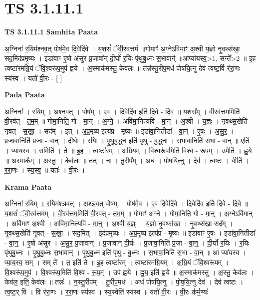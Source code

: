 \documentclass[17pt]{extarticle}
\begin{document}
\section{ TS 3.1.11.1 }

\textbf{TS 3.1.11.1 } \newline
\textbf{Samhita Paata} \newline

अ॒ग्निना॑ र॒यिम॑श्नव॒त् पोष॑मे॒व दि॒वेदि॑वे । य॒शसं॑ ॅवी॒रव॑त्तमं ॥गोमाꣳ॑ अ॒ग्नेऽवि॑माꣳ अ॒श्वी य॒ज्ञो नृ॒वथ्स॑खा॒ सद॒मिद॑प्रमृ॒ष्यः । इडा॑वाꣳ ए॒षो अ॑सुर प्र॒जावा᳚न् दी॒र्घो र॒यिः पृ॑थुबु॒ध्नः स॒भावान्॑ ॥आप्या॑यस्व॒>1, सन्ते᳚>2 ॥ इ॒ह त्वष्टा॑रमग्रि॒यं ॅवि॒श्वरू॑प॒मुप॑ ह्वये । अ॒स्माक॑मस्तु॒ केव॑लः ॥ तन्न॑स्तु॒रीप॒मध॑ पोषयि॒त्नु देव॑ त्वष्ट॒र्वि र॑रा॒णः स्य॑स्व । यतो॑ वी॒रः - [  ] \newline

\textbf{Pada Paata} \newline

अ॒ग्निना᳚ । र॒यिम् । अ॒श्न॒व॒त् । पोष᳚म् । ए॒व । दि॒वेदि॑व॒ इति॑ दि॒वे - दि॒व॒ ॥ य॒शस᳚म् । वी॒रव॑त्तम॒मिति॑ वी॒रव॑त् - त॒म॒म् ॥ गोमा॒निति॒ गो - मा॒न् । अ॒ग्ने॒ । अवि॑मा॒नित्यवि॑ - मा॒न् । अ॒श्वी । य॒ज्ञ्ः । नृ॒वथ्स॒खेति॑ नृ॒वत् - स॒खा॒ । सद᳚म् । इत् । अ॒प्र॒मृ॒ष्य इत्य॑प्र - मृ॒ष्यः ॥ इडा॑वा॒नितीडा᳚ - वा॒न् । ए॒षः । अ॒सु॒र॒ । प्र॒जावा॒निति॑ प्र॒जा - वा॒न् । दी॒र्घः । र॒यिः । पृ॒थु॒बु॒द्ध्न इति॑ पृथु - बु॒द्ध्नः । स॒भावा॒निति॑ स॒भा - वा॒न् ॥ एति॑ । प्या॒य॒स्व॒ । समिति॑ । ते॒ ॥ इ॒ह । त्वष्टा॑रम् । अ॒ग्रि॒यम् । वि॒श्वरू॑प॒मिति॑ वि॒श्व - रू॒प॒म् । उपेति॑ । ह्व॒ये॒ ॥ अ॒स्माक᳚म् । अ॒स्तु॒ । केव॑लः ॥ तत् । नः॒ । तु॒रीप᳚म् । अध॑ । पो॒ष॒यि॒त्नु । देव॑ । त्व॒ष्टः॒ । वीति॑ । र॒रा॒णः । स्य॒स्व॒ ॥ यतः॑ । वी॒रः ।  \newline


\textbf{Krama Paata} \newline

अ॒ग्निना॑ र॒यिम् । र॒यिम॑श्ञवत् । अ॒श्ञ॒व॒त् पोष᳚म् । पोष॑मे॒व । ए॒व दि॒वेदि॑वे । दि॒वेदि॑व॒ इति॑ दि॒वे - दि॒वे॒ ॥ य॒शसं॑ ॅवी॒रव॑त्तमम् । वी॒रव॑त्तम॒मिति॑ वी॒रव॑त् - त॒म॒म् ॥ गोमाꣳ॑ अग्ने । गोमा॒निति॒ गो - मा॒न्॒ । अ॒ग्नेऽवि॑मान् । अवि॑माꣳ अ॒श्वी । अवि॑मा॒नित्यवि॑ - मा॒न्॒ । अ॒श्वी य॒ज्ञ्ः । य॒ज्ञो नृ॒वथ्स॑खा । नृ॒वथ्स॑खा॒ सद᳚म् । नृ॒वथ्स॒खेति॑ नृ॒वत् - स॒खा॒ । सद॒मित् । इद॑प्रमृ॒ष्यः । अ॒प्र॒मृ॒ष्य इत्य॑प्र - मृ॒ष्यः ॥ इडा॑वाꣳ ए॒षः । इडा॑वा॒नितीडा᳚ - वा॒न्॒ । ए॒षो अ॑सुर । अ॒सु॒र॒ प्र॒जावान्॑ । प्र॒जावा᳚न् दी॒र्घः । प्र॒जावा॒निति॑ प्र॒जा - वा॒न्॒ । दी॒र्घो र॒यिः । र॒यिः पृ॑थुबु॒ध्नः । पृ॒थु॒बु॒ध्नः स॒भावान्॑ । पृ॒थु॒बु॒ध्न इति॑ पृथु - बु॒ध्नः । स॒भावा॒निति॑ स॒भा - वा॒न् ॥ आ प्या॑यस्व । प्या॒य॒स्व॒ सम् । सम् ते᳚ । त॒ इति॑ ते ॥ इ॒ह त्वष्टा॑रम् । त्वष्टा॑रमग्रि॒यम् । अ॒ग्रि॒यं ॅवि॒श्वरू॑पम् । वि॒श्वरू॑प॒मुप॑ । वि॒श्वरू॑प॒मिति॑ वि॒श्व - रू॒प॒म् । उप॑ ह्वये । ह्व॒य॒ इति॑ ह्वये ॥ अ॒स्माक॑मस्तु । अ॒स्तु॒ केव॑लः । केव॑ल॒ इति॒ केव॑लः ॥ तन्नः॑ । न॒स्तु॒रीप᳚म् । तु॒रीप॒मध॑ । अध॑ पोषयि॒त्नु । पो॒ष॒यि॒त्नु देव॑ । देव॑ त्वष्टः । त्व॒ष्ट॒र् वि । वि र॑रा॒णः । र॒रा॒णः स्य॑स्व । स्य॒स्वेति॑ स्यस्व ॥ यतो॑ वी॒रः । वी॒रः क॑र्म॒ण्यः॑ \newline
\end{document}

